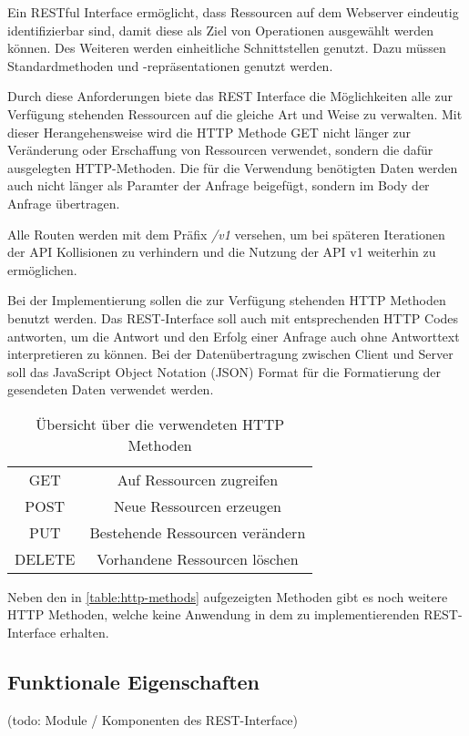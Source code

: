 Ein RESTful Interface ermöglicht, dass Ressourcen auf dem Webserver eindeutig identifizierbar sind, damit diese als Ziel von Operationen ausgewählt werden können. Des Weiteren werden einheitliche Schnittstellen genutzt. Dazu müssen Standardmethoden und -repräsentationen genutzt werden.

Durch diese Anforderungen biete das REST Interface die Möglichkeiten alle zur Verfügung stehenden Ressourcen auf die gleiche Art und Weise zu verwalten. Mit dieser Herangehensweise wird die HTTP Methode GET nicht länger zur Veränderung oder Erschaffung von Ressourcen verwendet, sondern die dafür ausgelegten HTTP-Methoden. Die für die Verwendung benötigten Daten werden auch nicht länger als Paramter der Anfrage beigefügt, sondern im Body der Anfrage übertragen. \cite{beimsWebApplikationenREST2014}

Alle Routen werden mit dem Präfix \textit{/v1} versehen, um bei späteren Iterationen der API Kollisionen zu verhindern und die Nutzung der API v1 weiterhin zu ermöglichen. 

Bei der Implementierung sollen die zur Verfügung stehenden HTTP Methoden benutzt werden. Das REST-Interface soll auch mit entsprechenden HTTP Codes antworten, um die Antwort und den Erfolg einer Anfrage auch ohne Antworttext interpretieren zu können. Bei der Datenübertragung zwischen Client und Server soll das JavaScript Object Notation (JSON) Format für die Formatierung der gesendeten Daten verwendet werden.

\begin{table}
	\centering
	\begin{tabular}{c c}
		GET & Auf Ressourcen zugreifen \\ 
		POST & Neue Ressourcen erzeugen \\  
		PUT & Bestehende Ressourcen verändern \\
		DELETE & Vorhandene Ressourcen löschen \\
	\end{tabular}
	\caption{Übersicht über die verwendeten HTTP Methoden}
	\label{table:http-methods}
\end{table}

Neben den in \autoref{table:http-methods} aufgezeigten Methoden gibt es noch weitere HTTP Methoden, welche keine Anwendung in dem zu implementierenden REST-Interface erhalten.

\subsection{Funktionale Eigenschaften}
(todo: Module / Komponenten des REST-Interface)
